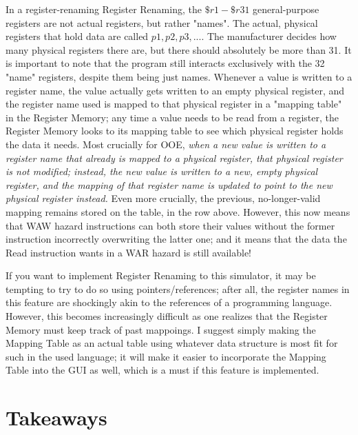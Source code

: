 \documentclass[12pt,twoside]{reedthesis}
\begin{document}
In a register-renaming Register Renaming, the $\$r1 - \$r31$ general-purpose registers are not actual registers, but rather "names". The actual, physical registers that hold data are called $p1, p2, p3, ...$. The manufacturer decides how many physical registers there are, but there should absolutely be more than 31. It is important to note that the program still interacts exclusively with the 32 "name" registers, despite them being just names. Whenever a value is written to a register name,  the value actually gets written to an empty physical register, and the register name used is mapped to that physical register in a "mapping table" in the Register Memory; any time a value needs to be read from a register, the Register Memory looks to its mapping table to see which physical register holds the data it needs. Most crucially for OOE, \textit{when a new value is written to a register name that already is mapped to a physical register, that physical register is not modified; instead, the new value is written to a new, empty physical register, and the mapping of that register name is updated to point to the new physical register instead.} Even more crucially, the previous, no-longer-valid mapping remains stored on the table, in the row above. However, this now means that WAW hazard instructions can both store their values without the former instruction incorrectly overwriting the latter one; and it means that the data the Read instruction wants in a WAR hazard is still available!

If you want to implement Register Renaming to this simulator, it may be tempting to try to do so using pointers/references; after all, the register names in this feature are shockingly akin to the references of a programming language. However, this becomes increasingly difficult as one realizes that the Register Memory must keep track of past mappoings. I suggest simply making the Mapping Table as an actual table using whatever data structure is most fit for such in the used language; it will make it easier to incorporate the Mapping Table into the GUI as well, which is a must if this feature is implemented.


\section*{Takeaways}
\end{document}

